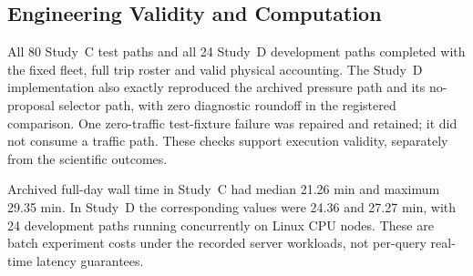 \subsection{Engineering Validity and Computation}
All 80 Study~C test paths and all 24 Study~D development paths completed with the fixed fleet, full trip roster and valid physical accounting. The Study~D implementation also exactly reproduced the archived pressure path and its no-proposal selector path, with zero diagnostic roundoff in the registered comparison. One zero-traffic test-fixture failure was repaired and retained; it did not consume a traffic path. These checks support execution validity, separately from the scientific outcomes.

Archived full-day wall time in Study~C had median 21.26 min and maximum 29.35 min. In Study~D the corresponding values were 24.36 and 27.27 min, with 24 development paths running concurrently on Linux CPU nodes. These are batch experiment costs under the recorded server workloads, not per-query real-time latency guarantees.
